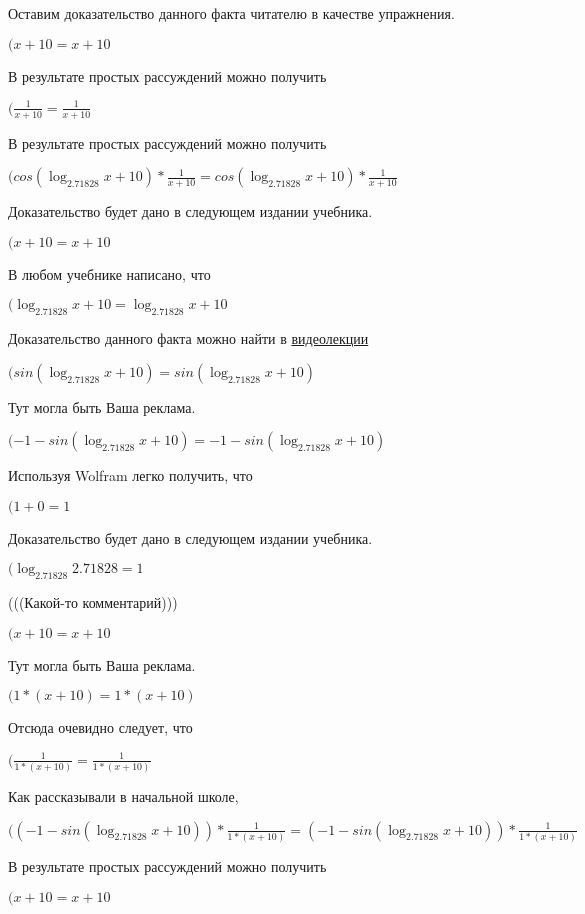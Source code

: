\documentclass[12pt,a4paper,fleqn]{article}
\theoremstyle{definition}
\begin{document}
Оставим доказательство данного факта читателю в качестве упражнения.

$( x  +  10  =  x  +  10 $

В результате простых рассуждений можно получить

$(\frac{ 1 }{ x  +  10 }
 = \frac{ 1 }{ x  +  10 }
$

В результате простых рассуждений можно получить

$(cos(\log_{ 2.71828 }{ x  +  10 }) * \frac{ 1 }{ x  +  10 }
 = cos(\log_{ 2.71828 }{ x  +  10 }) * \frac{ 1 }{ x  +  10 }
$

Доказательство будет дано в следующем издании учебника.

$( x  +  10  =  x  +  10 $

В любом учебнике написано, что

$(\log_{ 2.71828 }{ x  +  10 } = \log_{ 2.71828 }{ x  +  10 }$

Доказательство данного факта можно найти в \href{https://www.youtube.com/watch?v=dQw4w9WgXcQ}{видеолекции}

$(sin(\log_{ 2.71828 }{ x  +  10 }) = sin(\log_{ 2.71828 }{ x  +  10 })$

Тут могла быть Ваша реклама.

$( -1  - sin(\log_{ 2.71828 }{ x  +  10 }) =  -1  - sin(\log_{ 2.71828 }{ x  +  10 })$

Используя Wolfram легко получить, что

$( 1  +  0  =  1 $

Доказательство будет дано в следующем издании учебника.

$(\log_{ 2.71828 }{ 2.71828 } =  1 $

(((Какой-то комментарий)))

$( x  +  10  =  x  +  10 $

Тут могла быть Ваша реклама.

$( 1  * ( x  +  10 ) =  1  * ( x  +  10 )$

Отсюда очевидно следует, что

$(\frac{ 1 }{ 1  * ( x  +  10 )}
 = \frac{ 1 }{ 1  * ( x  +  10 )}
$

Как рассказывали в начальной школе,

$(( -1  - sin(\log_{ 2.71828 }{ x  +  10 })) * \frac{ 1 }{ 1  * ( x  +  10 )}
 = ( -1  - sin(\log_{ 2.71828 }{ x  +  10 })) * \frac{ 1 }{ 1  * ( x  +  10 )}
$

В результате простых рассуждений можно получить

$( x  +  10  =  x  +  10 $
\end{document}
